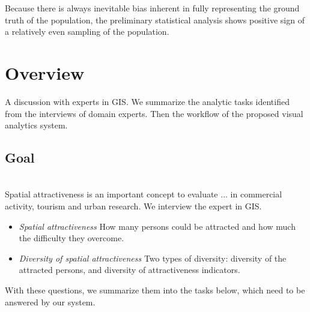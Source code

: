 Because there is always inevitable bias inherent in fully representing the ground truth of the population, the preliminary statistical analysis shows positive sign of a relatively even sampling of the population.


\section{Overview}

A discussion with experts in GIS. We summarize the analytic tasks identified from the interviews of domain experts. Then the workflow of the proposed visual analytics system.

\subsection{Goal}
\\

Spatial attractiveness is an important concept to evaluate ... in commercial activity, tourism and urban research. We interview the expert in GIS.  

\begin{itemize}
  \item \textit{Spatial attractiveness} How many persons could be attracted and how much the difficulty they overcome.  

  \item \textit{Diversity of spatial attractiveness} Two types of diversity: diversity of the attracted persons, and diversity of attractiveness indicators.  
\end{itemize}
With these questions, we summarize them into the tasks below, which need to be answered by our system.


